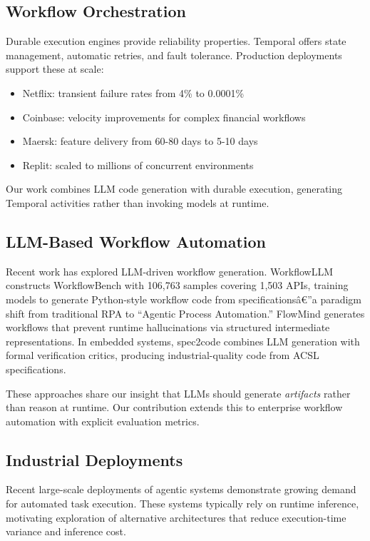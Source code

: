 \documentclass[11pt]{article}
\begin{document}
\subsection{Workflow Orchestration}

Durable execution engines provide reliability properties. Temporal \citep{temporal2024} offers state management, automatic retries, and fault tolerance. Production deployments support these at scale:
\begin{itemize}
    \item Netflix: transient failure rates from 4\% to 0.0001\%
    \item Coinbase: velocity improvements for complex financial workflows
    \item Maersk: feature delivery from 60-80 days to 5-10 days
    \item Replit: scaled to millions of concurrent environments
\end{itemize}

Our work combines LLM code generation with durable execution, generating Temporal activities rather than invoking models at runtime.

\subsection{LLM-Based Workflow Automation}

Recent work has explored LLM-driven workflow generation. WorkflowLLM \citep{fan2024workflowllm} constructs WorkflowBench with 106,763 samples covering 1,503 APIs, training models to generate Python-style workflow code from specificationsâ€”a paradigm shift from traditional RPA to ``Agentic Process Automation.'' FlowMind \citep{zeng2024flowmind} generates workflows that prevent runtime hallucinations via structured intermediate representations. In embedded systems, spec2code \citep{patil2024spec2code} combines LLM generation with formal verification critics, producing industrial-quality code from ACSL specifications.

These approaches share our insight that LLMs should generate \textit{artifacts} rather than reason at runtime. Our contribution extends this to enterprise workflow automation with explicit evaluation metrics.

\subsection{Industrial Deployments}

Recent large-scale deployments of agentic systems demonstrate growing demand for automated task execution. These systems typically rely on runtime inference, motivating exploration of alternative architectures that reduce execution-time variance and inference cost.
\end{document}
